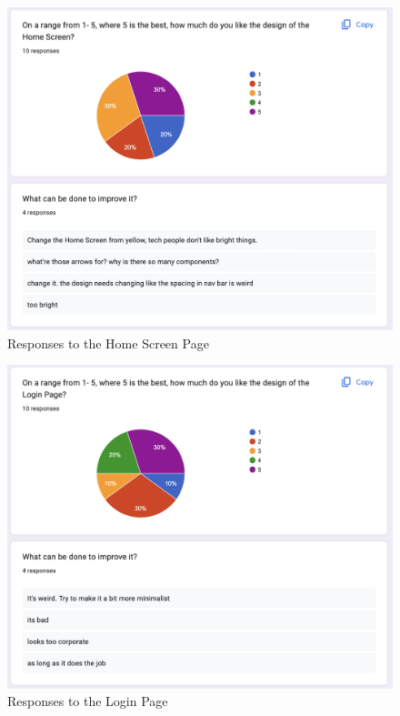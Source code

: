 \begin{figure}
    \centering
    \includegraphics[width=140mm]{Figures/home-screen.png}
    \caption{Responses to the Home Screen Page}
    \label{fig:home-screen-responses}
\end{figure}
\begin{figure}
    \centering
    \includegraphics[width=140mm]{Figures/login-page.png}
    \caption{Responses to the Login Page}
    \label{fig:login-page-responses}
\end{figure}
